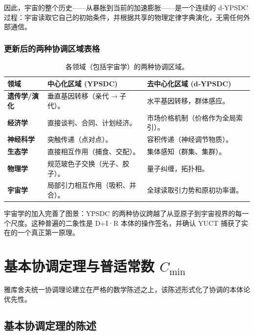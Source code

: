 \documentclass[11pt,a4paper]{article}
\begin{document}
	因此，宇宙的整个历史——从暴胀到当前的加速膨胀——是一个连续的 d‑YPSDC 过程：宇宙读取它自己的初始条件，并根据共享的物理定律字典演化，无需任何外部通信。
	
	\subsubsection*{更新后的两种协调区域表格}
	\begin{table}[htbp]
		\centering
		\caption{各领域（包括宇宙学）的两种协调区域。}
		\label{tab:two-regimes-full}
		\small
		\begin{tabular}{p{2.5cm}p{4.5cm}p{4.5cm}}
			\toprule
			\textbf{领域} & \textbf{中心化区域 (YPSDC)} & \textbf{去中心化区域 (d‑YPSDC)} \\
			\midrule
			\textbf{遗传学/演化} &
			垂直基因转移（亲代$\to$子代）。 &
			水平基因转移，群体感应。 \\
			\midrule
			\textbf{经济学} &
			直接谈判、合同、计划经济。 &
			市场价格机制（价格作为全局索引）。 \\
			\midrule
			\textbf{神经科学} &
			突触传递（点对点）。 &
			容积传递（神经调节物质）。 \\
			\midrule
			\textbf{生态学} &
			直接相互作用（捕食、交配）。 &
			集体感知（群集、集群）。 \\
			\midrule
			\textbf{物理学} &
			规范玻色子交换（光子、胶子）。 &
			量子纠缠，拓扑相。 \\
			\midrule
			\textbf{宇宙学} &
			局部引力相互作用（吸积、并合）。 &
			全球读取引力势和原初功率谱。 \\
			\bottomrule
		\end{tabular}
	\end{table}
	
	\noindent
	宇宙学的加入完善了图景：YPSDC 的两种协议跨越了从亚原子到宇宙视界的每一个尺度。这种普遍的二象性是 D+I·R 本体的操作签名，并确认 YUCT 捕获了实在的一个真正第一原理。
	
	\section{基本协调定理与普适常数 \texorpdfstring{$C_{\min}$}{C\_min}}
	\label{sec:fundamental-theorem}
	
	雅库舍夫统一协调理论建立在严格的数学陈述之上，该陈述形式化了协调的本体论优先性。
	
	\subsection{基本协调定理的陈述}
	
\end{document}
